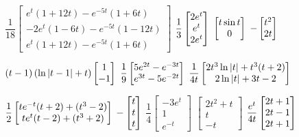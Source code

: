 \smallskip

$\dfrac{1}{18}{\begin{bmatrix}e^t(1+12t)-e^{-5t}(1+6t)\\-2e^t(1-6t)-
e^{-5t}(1-12t)\\e^t(1+12t)-e^{-5t}(1+6t)
\end{bmatrix}}$
 $\displaystyle{\frac{1}{3}\begin{bmatrix}2e^t\\e^t\\2e^t
\end{bmatrix}}$
 $\displaystyle{\begin{bmatrix}t\sin t\\0
\end{bmatrix}}$
 $\displaystyle{-\begin{bmatrix}t^2\\2t
\end{bmatrix}}$

\smallskip

$\displaystyle{(t-1)\left(\ln|t-1|+t\right)\begin{bmatrix}1\\-1
\end{bmatrix}}$
$\displaystyle{\frac{1}{9}\begin{bmatrix}5e^{2t}-e^{-3t}\\e^{3t}-5e^{-2t}
\end{bmatrix}}$
$\displaystyle{\frac{1}{4t}\begin{bmatrix}2t^3\ln|t|+t^3(t+2)\\
2\ln|t|+3t-2
\end{bmatrix}}$

\smallskip

$\displaystyle{\frac{1}{2}\begin{bmatrix}te^{-t}(t+2)+(t^3-2)\\
te^t(t-2)+(t^3+2)
\end{bmatrix}}$
 $\displaystyle{-\begin{bmatrix}t\\t\\t
\end{bmatrix}}$
$\dfrac{1}{4}\begin{bmatrix}-3e^t\\
1\\e^{-t}\end{bmatrix}$
$\begin{bmatrix}2t^2+t\\t\\-t\end{bmatrix}$
$\displaystyle{\frac{e^t}{4t}\begin{bmatrix}2t+1\\2t-1\\2t+1
\end{bmatrix}}$



